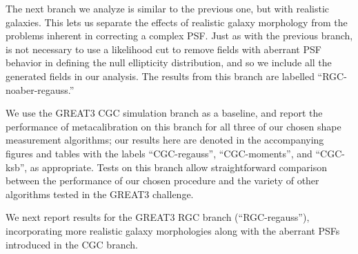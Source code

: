 \documentclass[iop]{emulateapj}
\newcommand\rmcomment[1]{\textcolor{red}{(RM: #1)}}
\begin{document}
The next branch we analyze is similar to the previous one, but with
realistic galaxies. This lets us separate the effects of realistic
galaxy morphology from the problems inherent in correcting a complex
PSF. Just as with the previous branch, is not necessary to use a
likelihood cut to remove fields with aberrant PSF behavior in defining
the null ellipticity distribution, and so we include all the generated
fields in our analysis. The results from this branch are labelled
``RGC-noaber-regauss.''

We use the GREAT3 CGC simulation branch as a baseline, and report the
performance of metacalibration on this branch for all three of our
chosen shape measurement algorithms; our results here are denoted in
the accompanying figures and tables with the labels ``CGC-regauss'',
``CGC-moments'', and ``CGC-ksb'', as appropriate.  Tests on this branch allow
straightforward comparison between the performance of our chosen
procedure and the variety of other algorithms tested in the GREAT3
challenge.

We next report results for the GREAT3 RGC branch (``RGC-regauss''),
incorporating more realistic galaxy morphologies along with the
aberrant PSFs introduced in the CGC branch. 
\end{document}
